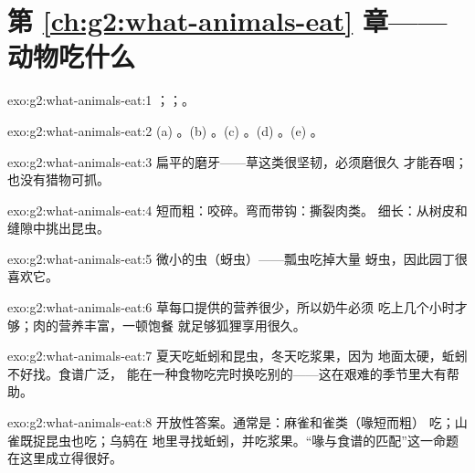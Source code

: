 \section*{第 \ref{ch:g2:what-animals-eat} 章——动物吃什么}

\begin{solution}{exo:g2:what-animals-eat:1}
；；。
\end{solution}

\begin{solution}{exo:g2:what-animals-eat:2}
(a) 。(b) 。(c) 。(d) 。(e)
。
\end{solution}

\begin{solution}{exo:g2:what-animals-eat:3}
扁平的磨牙——草这类很坚韧，必须磨很久
才能吞咽；也没有猎物可抓。
\end{solution}

\begin{solution}{exo:g2:what-animals-eat:4}
短而粗：咬碎。弯而带钩：撕裂肉类。
细长：从树皮和缝隙中挑出昆虫。
\end{solution}

\begin{solution}{exo:g2:what-animals-eat:5}
微小的虫（蚜虫）——瓢虫吃掉大量
蚜虫，因此园丁很喜欢它。
\end{solution}

\begin{solution}{exo:g2:what-animals-eat:6}
草每口提供的营养很少，所以奶牛必须
吃上几个小时才够；肉的营养丰富，一顿饱餐
就足够狐狸享用很久。
\end{solution}

\begin{solution}{exo:g2:what-animals-eat:7}
夏天吃蚯蚓和昆虫，冬天吃浆果，因为
地面太硬，蚯蚓不好找。食谱广泛，
能在一种食物吃完时换吃别的——这在艰难的季节里大有帮助。
\end{solution}

\begin{solution}{exo:g2:what-animals-eat:8}
开放性答案。通常是：麻雀和雀类（喙短而粗）
吃；山雀既捉昆虫也吃；乌鸫在
地里寻找蚯蚓，并吃浆果。“喙与食谱的匹配”这一命题
在这里成立得很好。
\end{solution}

